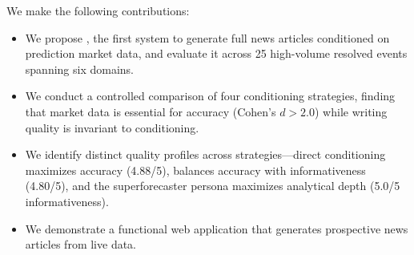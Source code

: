 We make the following contributions:
\begin{itemize}[leftmargin=*,itemsep=0pt,topsep=0pt]
    \item We propose \systemname, the first system to generate full news articles conditioned on prediction market data, and evaluate it across 25 high-volume resolved events spanning six domains.
    \item We conduct a controlled comparison of four conditioning strategies, finding that market data is essential for accuracy (Cohen's $d > 2.0$) while writing quality is invariant to conditioning.
    \item We identify distinct quality profiles across strategies---direct conditioning maximizes accuracy (4.88/5), \mcp balances accuracy with informativeness (4.80/5), and the superforecaster persona maximizes analytical depth (5.0/5 informativeness).
    \item We demonstrate a functional web application that generates prospective news articles from live \polymarket data.
\end{itemize}
